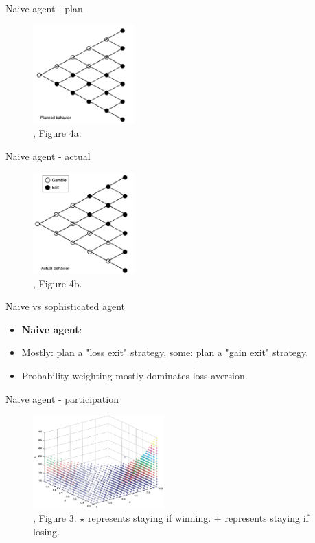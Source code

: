 \begin{frame}{Naive agent - plan}
\begin{figure}
\centering
    \includegraphics[width = 0.35\textwidth]{naive_plan.png}
    \caption{\citet{Barberis2012a}, Figure 4a.}
    \end{figure}
\end{frame}

\begin{frame}{Naive agent - actual}
\begin{figure}
\centering
    \includegraphics[width = 0.35\textwidth]{naive_final.png}
    \caption{\citet{Barberis2012a}, Figure 4b.}
    \end{figure}
\end{frame}


\begin{frame}{Naive vs sophisticated agent}
    \begin{itemize}
    	\item \textbf{Naive agent}:\medskip
        \item Mostly: plan a "loss exit" strategy, some: plan a "gain exit" strategy.\medskip
        \item Probability weighting mostly  dominates loss aversion.\bigskip
  	    \end{itemize}
\end{frame}

\begin{frame}{Naive agent - participation}
\begin{figure}
\centering
    \includegraphics[width = 0.45\textwidth]{cpt_naive}
    \caption{\citet{Barberis2012a}, Figure 3. $\star$ represents staying if winning. $+$ represents staying if losing.}
    \end{figure}
\end{frame}

